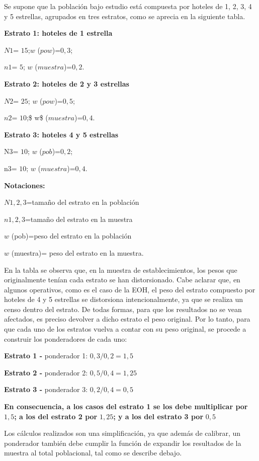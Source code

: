 \documentclass[
]{book}
\begin{document}
Se supone que la población bajo estudio está compuesta por hoteles de 1, 2, 3, 4 y 5 estrellas, agrupados en tres estratos, como se aprecia en la siguiente tabla.

\textbf{Estrato 1: hoteles de 1 estrella}

\(N1\)= \(15\);\(w\) (\(pow\))=\(0,3\);

\(n1\)= \(5\); \(w\) (\(muestra\))=\(0,2\).

\textbf{Estrato 2: hoteles de 2 y 3 estrellas}

\(N2\)= \(25\); \(w\) (\(pow\))=\(0,5\);

\(n2\)= \(10\);\$ w\$ (\(muestra\))=\(0,4\).

\textbf{Estrato 3: hoteles 4 y 5 estrellas}

N3= \(10\); \(w\) (\(pob\))=\(0,2\);

n3= \(10\); \(w\) (\(muestra\))=\(0,4\).

\textbf{Notaciones:}

\(N1,2,3\)=tamaño del estrato en la población

\(n1,2,3\)=tamaño del estrato en la muestra

\(w\) (pob)=peso del estrato en la población

\(w\) (muestra)= peso del estrato en la muestra.

En la tabla se observa que, en la muestra de establecimientos, los pesos que originalmente tenían cada estrato se han distorsionado. Cabe aclarar que, en algunos operativos, como es el caso de la EOH, el peso del estrato compuesto por hoteles de 4 y 5 estrellas se distorsiona intencionalmente, ya que se realiza un censo dentro del estrato. De todas formas, para que los resultados no se vean afectados, es preciso devolver a dicho estrato el peso original. Por lo tanto, para que cada uno de los estratos vuelva a contar con su peso original, se procede a construir los ponderadores de cada uno:

\textbf{Estrato 1 -} ponderador 1: \(0,3/0,2=1,5\)

\textbf{Estrato 2 -} ponderador 2: \(0,5/0,4=1,25\)

\textbf{Estrato 3 -} ponderador 3: \(0,2/0,4=0,5\)

\textbf{En consecuencia, a los casos del estrato 1 se los debe multiplicar por} \(1,5\)\textbf{; a los del estrato 2 por} \(1,25\)\textbf{; y a los del estrato 3 por} \(0,5\)

Los cálculos realizados son una simplificación, ya que además de calibrar, un ponderador también debe cumplir la función de expandir los resultados de la muestra al total poblacional, tal como se describe debajo.
\end{document}
